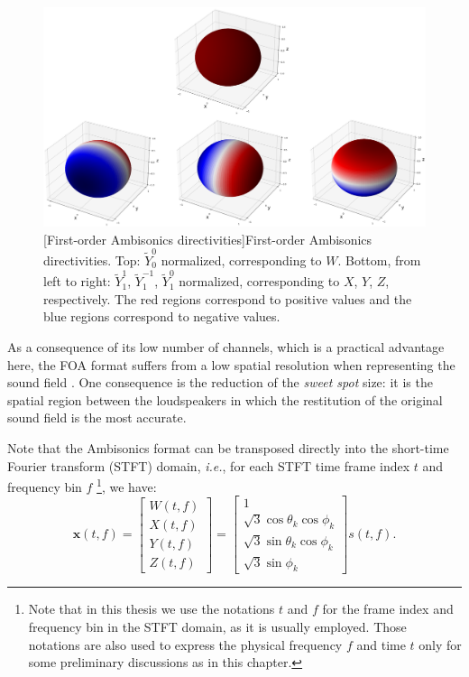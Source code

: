 \begin{figure}[t]
    \begin{center}
    \includegraphics[width=1.\linewidth]{Images/chap2/foa.png}
    [First-order Ambisonics directivities]{First-order Ambisonics directivities. Top: $\tilde{Y}_0^0$ normalized, corresponding to $W$. Bottom, from left to right: $\tilde{Y}_1^1$, $\tilde{Y}_1^{-1}$, $\tilde{Y}_1^0$ normalized, corresponding to $X$, $Y$, $Z$, respectively. The red regions correspond to positive values and the blue regions correspond to negative values.}
    \label{fig:foa}
    \end{center}
\end{figure}

As a consequence of its low number of channels, which is a practical advantage here, the FOA format suffers from a low spatial resolution when representing the sound field \cite{rafaely_analysis_2005}. One consequence is the reduction of the \textit{sweet spot} size: it is the spatial region between the loudspeakers in which the restitution of the original sound field is the most accurate. 

Note that the Ambisonics format can be transposed directly into the short-time Fourier transform (STFT) domain, \emph{i.e.}, for each STFT time frame index $t$ and frequency bin $f$ \footnote{Note that in this thesis we use the notations $t$ and $f$ for the frame index and frequency bin in the STFT domain, as it is usually employed. Those notations are also used to express the physical frequency $f$ and time $t$ only for some preliminary discussions as in this chapter.}, we have:
\begin{equation}
\label{eq:foaSTFT}
\mathbf{x}(t,f) = 
\begin{bmatrix} W(t,f) \\ X(t,f) \\ Y(t,f) \\ Z(t,f) \end{bmatrix}
= \begin{bmatrix} 1 \\ \sqrt{3} \cos \theta_k \cos \phi_k \\ \sqrt{3} \sin \theta_k \cos \phi_k \\ \sqrt{3} \sin \phi_k \end{bmatrix} s(t,f).
\end{equation}


